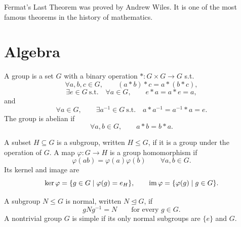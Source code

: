     \begin{remark}
        Fermat's Last Theorem was proved by Andrew Wiles. It is one of the most
        famous theorems in the history of mathematics.
    \end{remark}

    \chapter{Algebra}



    \begin{definition}[Group]
        A group is a set $G$ with a binary operation $\ast:G\times G\to G$ s.t.
        \[
            \forall a,b,c\in G,
            \qquad
            (a\ast b)\ast c=a\ast(b\ast c),
        \]
        \[
            \exists e\in G\ \text{s.t.}\quad
            \forall a\in G,
            \qquad
            e\ast a=a\ast e=a,
        \]
        and
        \[
            \forall a\in G,
            \qquad
            \exists a^{-1}\in G\ \text{s.t.}\quad
            a\ast a^{-1}=a^{-1}\ast a=e.
        \]
        The group is abelian if
        \[
            \forall a,b\in G,
            \qquad
            a\ast b=b\ast a.
        \]
    \end{definition}


    \begin{definition}
        A subset $H\subseteq G$ is a subgroup, written $H\leq G$, if it is a
        group under the operation of $G$. A map $\varphi:G\to H$ is a group
        homomorphism if
        \[
            \varphi(ab)=\varphi(a)\varphi(b)
            \qquad
            \forall a,b\in G.
        \]
        Its kernel and image are
        \[
            \ker\varphi=\{g\in G\mid\varphi(g)=e_H\},
            \qquad
            \operatorname{im}\varphi=\{\varphi(g)\mid g\in G\}.
        \]
    \end{definition}

    \begin{definition}
        A subgroup $N\leq G$ is normal, written $N\trianglelefteq G$, if
        \[
            gNg^{-1}=N
            \qquad
            \text{for every }g\in G.
        \]
        A nontrivial group $G$ is simple if its only normal subgroups are
        $\{e\}$ and $G$.
    \end{definition}


